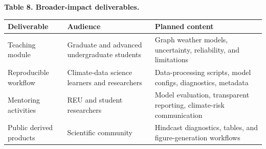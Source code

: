 \documentclass[11pt,letterpaper]{article}
\begin{document}
\begin{center}\scriptsize
\textbf{Table 8. Broader-impact deliverables.}\\[0.03in]
\begin{tabularx}{\textwidth}{p{}p{}X}
\toprule
\textbf{Deliverable} & \textbf{Audience} & \textbf{Planned content}\\
\midrule
Teaching module & Graduate and advanced undergraduate students & Graph weather models, uncertainty, reliability, and limitations\\
Reproducible workflow & Climate-data science learners and researchers & Data-processing scripts, model configs, diagnostics, metadata\\
Mentoring activities & REU and student researchers & Model evaluation, transparent reporting, climate-risk communication\\
Public derived products & Scientific community & Hindcast diagnostics, tables, and figure-generation workflows\\
\bottomrule
\end{tabularx}
\end{center}
\end{document}
